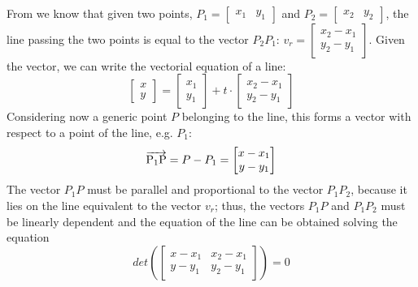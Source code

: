 \paragraph{}
From \cite{line_between_two_points} we know that given two points, $P_1 = \begin{bmatrix}x_1 & y_1\end{bmatrix}$ and $P_2 = \begin{bmatrix}x_2 & y_2\end{bmatrix}$, the line passing the two points is equal to the vector $P_2P_1$: 
$v_r = 
\begin{bmatrix}
    x_2 - x_1 \\
    y_2 - y_1
\end{bmatrix}$. Given the vector, we can write the vectorial equation of a line:
\begin{equation}
    \begin{bmatrix}
        x \\
        y
    \end{bmatrix}
    =
    \begin{bmatrix}
        x_1 \\
        y_1
    \end{bmatrix}
    + t \cdot \begin{bmatrix}
        x_2 - x_1 \\
        y_2 - y_1
    \end{bmatrix}
\end{equation}
Considering now a generic point $P$ belonging to the line, this forms a vector with respect to a point of the line, e.g. $P_1$:
\begin{equation}
    \overrightarrow{\rm P_1P} = P - P_1 = \begin{bmatrix}
        x - x_1 \\
        y - y_1
    \end{bmatrix}
\end{equation}
The vector $P_1P$ must be parallel and proportional to the vector $P_1P_2$, because it lies on the line equivalent to the vector $v_r$; thus, the vectors $P_1P$ and $P_1P_2$ must be linearly dependent and the equation of the line can be obtained solving the equation
\begin{equation}
    det \left ( 
    \begin{bmatrix}
        x - x_1 & x_2 - x_1 \\
        y - y_1 & y_2 - y_1
    \end{bmatrix}
    \right ) = 0
\end{equation}
